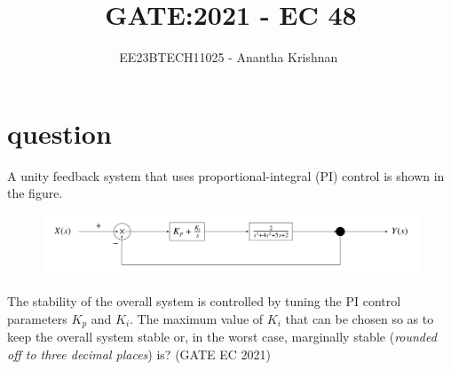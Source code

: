 \documentclass[journal,12pt,onecolumn]{IEEEtran}
\theoremstyle{remark}
\begin{document}

\vspace{3cm}

\title{GATE:2021 - EC 48 }
\author{EE23BTECH11025 - Anantha Krishnan $^{}$%
}
\maketitle
\bigskip



\section{question}
A unity feedback system that uses proportional-integral (PI) control is shown in the figure.
 \begin{figure}[!ht]    
    \centering
\graphicspath{ {2021/EC/48/figs} }
\includegraphics[width=\columnwidth]{figure_1}
\label{figure:ee25-gate4-graph}
\end{figure}
The stability of the overall system is controlled by tuning the PI control parameters $K_p$ and $K_i$. The maximum value of $K_i$ that can be chosen so as to keep the overall system stable or, in the worst case, marginally stable (\textit{rounded off to three decimal places}) is?
\hfill{(GATE EC 2021)}\\
 
\end{document}
